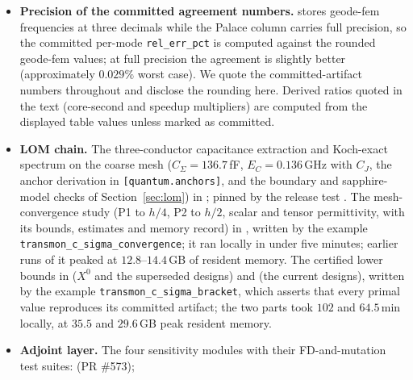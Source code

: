 \documentclass{anvil-paper}
\begin{document}
\begin{itemize}
    provenance are under
    . The
    source reading of Palace's port operator and search window, the
    port-voltage probe and the planned rank-1 formulation are in
    ; its probe
    is scratch source that the build does not compile.
  \item \textbf{Precision of the committed agreement numbers.}
     stores geode-fem
    frequencies at three decimals while the Palace column carries full
    precision, so the committed per-mode \texttt{rel\_err\_pct} is
    computed against the rounded geode-fem values; at full precision the
    agreement is slightly better (approximately $0.029\%$ worst case).
    We quote the committed-artifact numbers throughout and disclose the
    rounding here. Derived ratios quoted in the text (core-second and
    speedup multipliers) are computed from the displayed table values
    unless marked as committed.
  \item \textbf{LOM chain.} The three-conductor capacitance extraction
    and Koch-exact spectrum on the coarse mesh ($C_\Sigma = 136.7$\,fF,
    $E_C = 0.136$\,GHz with $C_J$, the anchor derivation in
    \texttt{[quantum.anchors]}, and the boundary and sapphire-model checks of
    Section~\ref{sec:lom}) in
    ; pinned by the
    release test .
    The mesh-convergence study (P1 to $h/4$, P2 to $h/2$, scalar and
    tensor permittivity, with its bounds, estimates and memory record)
    in ,
    written by the example \texttt{transmon\_c\_sigma\_convergence}; it
    ran locally in under five minutes; earlier runs of it peaked at
    $12.8$--$14.4$\,GB of resident memory. The certified lower bounds in
     ($X^0$ and the
    superseded designs) and
    (the current designs), written by the example
    \texttt{transmon\_c\_sigma\_bracket}, which asserts that every primal
    value reproduces its committed artifact; the two parts took $102$ and
    $64.5$\,min locally, at $35.5$ and $29.6$\,GB peak resident memory.
  \item \textbf{Adjoint layer.} The four sensitivity modules with their
    FD-and-mutation test suites:
     (PR \#573);

\end{itemize}
\end{document}
